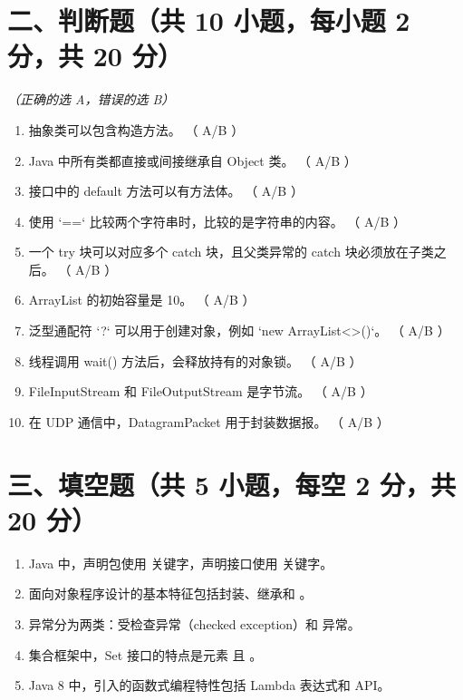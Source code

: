 \documentclass[a3paper, landscape, 11pt, twocolumn]{article}
\begin{document}
\section*{二、判断题（共 10 小题，每小题 2 分，共 20 分）}
\textit{（正确的选 A，错误的选 B）}

\begin{enumerate}[label=\arabic*., itemsep=0.8em]
	\item 抽象类可以包含构造方法。 （ \quad A/B \quad ）
	\item Java 中所有类都直接或间接继承自 Object 类。 （ \quad A/B \quad ）
	\item 接口中的 default 方法可以有方法体。 （ \quad A/B \quad ）
	\item 使用 `==` 比较两个字符串时，比较的是字符串的内容。 （ \quad A/B \quad ）
	\item 一个 try 块可以对应多个 catch 块，且父类异常的 catch 块必须放在子类之后。 （ \quad A/B \quad ）
	\item ArrayList 的初始容量是 10。 （ \quad A/B \quad ）
	\item 泛型通配符 `?` 可以用于创建对象，例如 `new ArrayList<>()`。 （ \quad A/B \quad ）
	\item 线程调用 wait() 方法后，会释放持有的对象锁。 （ \quad A/B \quad ）
	\item FileInputStream 和 FileOutputStream 是字节流。 （ \quad A/B \quad ）
	\item 在 UDP 通信中，DatagramPacket 用于封装数据报。 （ \quad A/B \quad ）
\end{enumerate}

\section*{三、填空题（共 5 小题，每空 2 分，共 20 分）}

\begin{enumerate}[label=\arabic*., itemsep=1em]
	\item Java 中，声明包使用 \underline{\hspace{4cm}} 关键字，声明接口使用 \underline{\hspace{4cm}} 关键字。

	\item 面向对象程序设计的基本特征包括封装、继承和 \underline{\hspace{4cm}}。

	\item 异常分为两类：受检查异常（checked exception）和 \underline{\hspace{4cm}} 异常。

	\item 集合框架中，Set 接口的特点是元素 \underline{\hspace{4cm}} 且 \underline{\hspace{4cm}}。

	\item Java 8 中，引入的函数式编程特性包括 Lambda 表达式和 \underline{\hspace{4cm}} API。
\end{enumerate}
\end{document}
